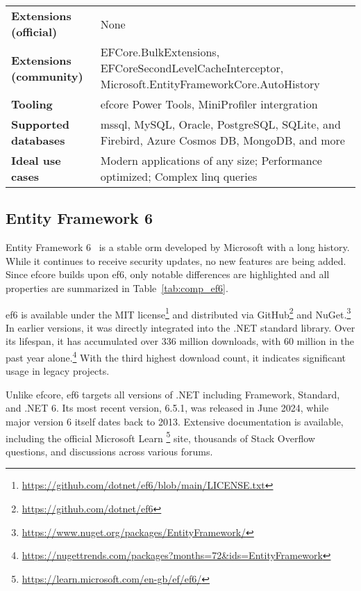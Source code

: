 {\begin{landscape}
\begin{table}[p]
\begin{tabular}{
>{\raggedright\arraybackslash}p{40.00mm}
>{\arraybackslash}p{150.00mm}
}
\textbf{Extensions (official)} & None \\
\textbf{Extensions (community)} & EFCore.BulkExtensions, EFCoreSecondLevelCacheInterceptor, Microsoft.EntityFrameworkCore.AutoHistory \\
\textbf{Tooling} & \acrshort{efcore} Power Tools, MiniProfiler intergration \\
\textbf{Supported databases} & \acrshort{mssql}, MySQL, Oracle, PostgreSQL, SQLite, and Firebird, Azure Cosmos DB, MongoDB, and more  \\
\textbf{Ideal use cases} & Modern applications of any size; Performance optimized; Complex \acrshort{linq} queries \\
\bottomrule
\end{tabular}
\end{table}
\end{landscape}
}

\subsection{Entity Framework 6}
Entity Framework 6~\cite{ef6,ef6Repo} is a stable \acrshort{orm} developed by Microsoft with a long history. While it continues to receive security updates, no new features are being added. Since \acrshort{efcore} builds upon \acrshort{ef}6, only notable differences are highlighted and all properties are summarized in Table~\ref{tab:comp_ef6}.

\acrshort{ef}6 is available under the MIT license\footnote{\url{https://github.com/dotnet/ef6/blob/main/LICENSE.txt}} and distributed via GitHub\footnote{\url{https://github.com/dotnet/ef6}} and NuGet.\footnote{\url{https://www.nuget.org/packages/EntityFramework/}} In earlier versions, it was directly integrated into the .NET standard library. Over its lifespan, it has accumulated over 336 million downloads, with 60 million in the past year alone.\footnote{\url{https://nugettrends.com/packages?months=72&ids=EntityFramework}} With the third highest download count, it indicates significant usage in legacy projects.

Unlike \acrshort{efcore}, \acrshort{ef}6 targets all versions of .NET including Framework, Standard, and .NET 6. Its most recent version, 6.5.1, was released in June 2024, while major version 6 itself dates back to 2013. Extensive documentation is available, including the official Microsoft Learn \footnote{\url{https://learn.microsoft.com/en-gb/ef/ef6/}} site, thousands of Stack Overflow questions, and discussions across various forums.

